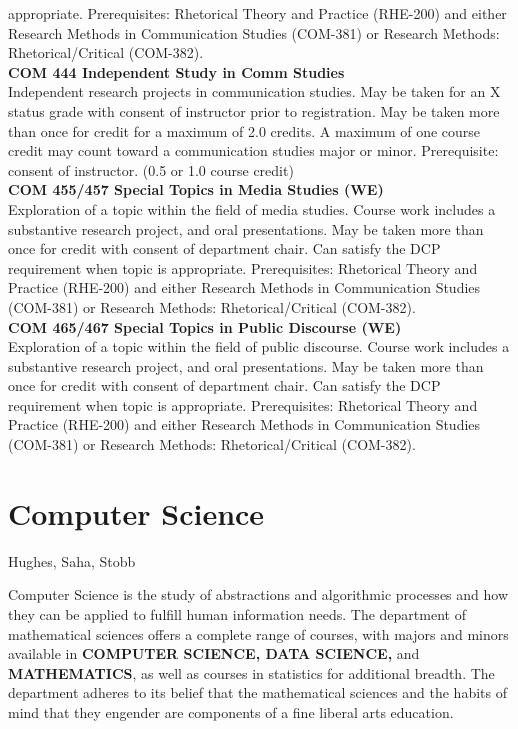 \documentclass[
  letterpaper,
]{scrbook}
\begin{document}
appropriate. Prerequisites: Rhetorical Theory and Practice (RHE-200) and
either Research Methods in Communication Studies (COM-381) or Research
Methods: Rhetorical/Critical (COM-382).\\
\textbf{COM 444 Independent Study in Comm Studies}\\
Independent research projects in communication studies. May be taken for
an X status grade with consent of instructor prior to registration. May
be taken more than once for credit for a maximum of 2.0 credits. A
maximum of one course credit may count toward a communication studies
major or minor. Prerequisite: consent of instructor. (0.5 or 1.0 course
credit)\\
\textbf{COM 455/457 Special Topics in Media Studies (WE)}\\
Exploration of a topic within the field of media studies. Course work
includes a substantive research project, and oral presentations. May be
taken more than once for credit with consent of department chair. Can
satisfy the DCP requirement when topic is appropriate. Prerequisites:
Rhetorical Theory and Practice (RHE-200) and either Research Methods in
Communication Studies (COM-381) or Research Methods: Rhetorical/Critical
(COM-382).\\
\textbf{COM 465/467 Special Topics in Public Discourse (WE)}\\
Exploration of a topic within the field of public discourse. Course work
includes a substantive research project, and oral presentations. May be
taken more than once for credit with consent of department chair. Can
satisfy the DCP requirement when topic is appropriate. Prerequisites:
Rhetorical Theory and Practice (RHE-200) and either Research Methods in
Communication Studies (COM-381) or Research Methods: Rhetorical/Critical
(COM-382).

\section{Computer Science}\label{computer-science}

Hughes, Saha, Stobb

Computer Science is the study of abstractions and algorithmic processes
and how they can be applied to fulfill human information needs. The
department of mathematical sciences offers a complete range of courses,
with majors and minors available in \textbf{COMPUTER SCIENCE, DATA
SCIENCE,} and \textbf{MATHEMATICS}, as well as courses in statistics for
additional breadth. The department adheres to its belief that the
mathematical sciences and the habits of mind that they engender are
components of a fine liberal arts education.
\end{document}
